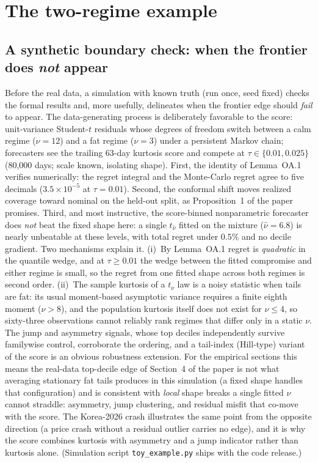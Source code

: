 \documentclass[11pt]{article}
\begin{document}
\section{The two-regime example}
\subsection*{A synthetic boundary check: when the frontier does
\emph{not} appear}\label{sec:toy}

Before the real data, a simulation with known truth (run once, seed
fixed) checks the formal results and, more usefully, delineates when
the frontier edge should \emph{fail} to appear. The data-generating
process is deliberately favorable to the score: unit-variance
Student-$t$ residuals whose degrees of freedom switch between a calm
regime ($\nu=12$) and a fat regime ($\nu=3$) under a persistent Markov
chain; forecasters see the trailing 63-day kurtosis score and compete
at $\tau \in \{0.01, 0.025\}$ (80{,}000 days; scale known, isolating
shape). First, the identity of Lemma~OA.1
verifies numerically: the regret integral and the Monte-Carlo regret
agree to five decimals ($3.5\times10^{-5}$ at $\tau=0.01$). Second, the
conformal shift moves realized coverage toward nominal on the held-out
split, as Proposition~1 of the paper promises. Third, and most instructive, the score-binned nonparametric
forecaster does
\emph{not} beat the fixed shape here: a single $t_{\widehat\nu}$
fitted on the mixture ($\widehat\nu = 6.8$) is nearly unbeatable at
these levels, with total regret under $0.5\%$ and no decile gradient.
Two mechanisms explain it. (i)~By
Lemma~OA.1 regret is \emph{quadratic} in the quantile
wedge, and at $\tau \ge 0.01$ the wedge between the fitted compromise
and either regime is small, so the regret from one fitted shape across
both regimes is second order. (ii)~The sample kurtosis of a $t_\nu$ law is a noisy statistic when
tails are fat: its usual moment-based asymptotic variance requires a
finite eighth moment ($\nu>8$), and the population kurtosis itself does
not exist for $\nu\le4$, so sixty-three observations cannot reliably
rank regimes that differ only in a static $\nu$. The jump and
asymmetry signals, whose top deciles independently survive familywise
control, corroborate the ordering, and a tail-index (Hill-type)
variant of the score is an obvious robustness extension. For the empirical sections this means the real-data top-decile edge of Section~4 of the paper
is not what averaging stationary fat tails produces in this
simulation (a fixed shape handles that configuration) and is consistent with \emph{local} shape breaks a single
fitted $\nu$ cannot straddle: asymmetry, jump clustering, and residual misfit
that co-move with the score. The Korea-2026 crash illustrates the same point from the opposite direction (a price crash without a residual outlier carries no edge), and it is why the score combines
kurtosis with asymmetry and a jump indicator rather than kurtosis
alone. (Simulation script \texttt{toy\_example.py} ships with the code
release.)
\end{document}
